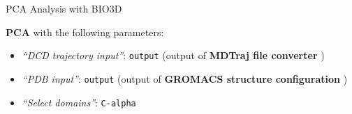 \documentclass[twocolumn]{bmcart}%
\providecommand{\tightlist}{%
  \setlength{\itemsep}{0pt}\setlength{\parskip}{0pt}}
\begin{document}
\begin{handson_box_colour}{PCA Analysis with BIO3D}


  \textbf{PCA} with the following parameters:

  \begin{itemize}
  \tightlist
  \item
    \emph{``DCD trajectory input''}: \texttt{output} (output of
    \textbf{MDTraj file converter} )
  \item
    \emph{``PDB input''}: \texttt{output} (output of \textbf{GROMACS
    structure configuration} )
  \item
    \emph{``Select domains''}: \texttt{C-alpha}
  \end{itemize}

\end{handson_box_colour}
\end{document}
